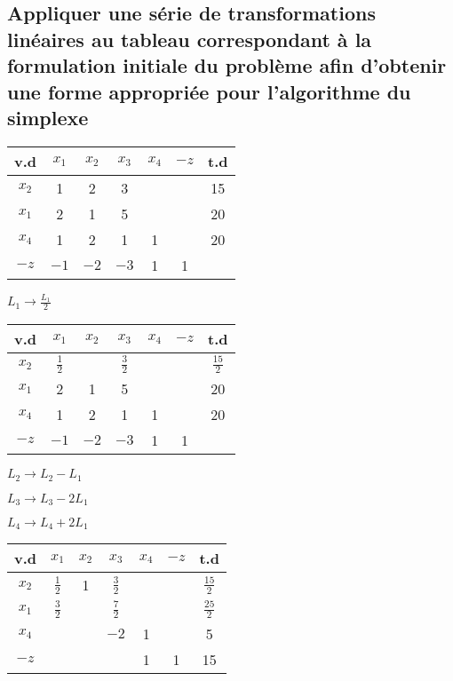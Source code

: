 \subsection{Appliquer une série de transformations linéaires au tableau correspondant à la formulation initiale du problème afin d’obtenir une forme appropriée pour l’algorithme du simplexe}

\begin{center}
\renewcommand{\arraystretch}{1.5}
\begin{tabular}{|c|ccccc|c|}
	\hline
	 v.d  & $x_1$ & $x_2$ & $x_3$ & $x_4$ & $-z$ & t.d \\ \hline
	$x_2$ &   1   &   2   &   3   &       &      & 15  \\
	$x_1$ &   2   &   1   &   5   &       &      & 20  \\
	$x_4$ &   1   &   2   &   1   &   1   &      & 20  \\ \hline
	$-z$  & $-1$  & $-2$  & $-3$  &   1   &  1   &     \\ \hline
\end{tabular}

$L_1 \to \frac{L_1}{2}$

\begin{tabular}{|c|ccccc|c|}
	\hline
	 v.d  &     $x_1$     &    $x_2$    &     $x_3$     & $x_4$ & $-z$ &      t.d       \\ \hline
	$x_2$ & $\frac{1}{2}$ & \Circled{1} & $\frac{3}{2}$ &       &      & $\frac{15}{2}$ \\
	$x_1$ &       2       &      1      &       5       &       &      &       20       \\
	$x_4$ &       1       &      2      &       1       &   1   &      &       20       \\ \hline
	$-z$  &     $-1$      &    $-2$     &     $-3$      &   1   &  1   &                \\ \hline
\end{tabular}

$L_2 \to L_2 - L_1$

$L_3 \to L_3 - 2L_1$

$L_4 \to L_4 + 2L_1$

\begin{tabular}{|c|ccccc|c|}
	\hline
	 v.d  &     $x_1$     & $x_2$ &     $x_3$     & $x_4$ & $-z$ &      t.d       \\ \hline
	$x_2$ & $\frac{1}{2}$ &   1   & $\frac{3}{2}$ &       &      & $\frac{15}{2}$ \\
	$x_1$ & $\frac{3}{2}$ &       & $\frac{7}{2}$ &       &      & $\frac{25}{2}$ \\
	$x_4$ &               &       &     $-2$      &   1   &      &       5        \\ \hline
	$-z$  &               &       &               &   1   &  1   &       15       \\ \hline
\end{tabular}


\end{center}
